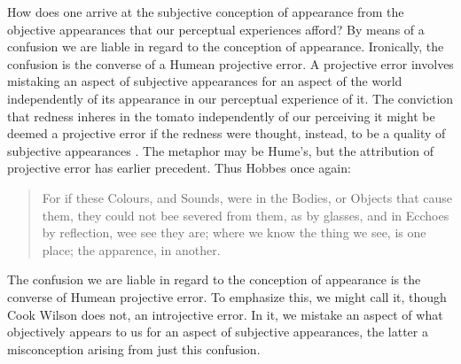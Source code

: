 \documentclass[12pt]{article}
\begin{document}
How does one arrive at the subjective conception of appearance from the objective appearances that our perceptual experiences afford? By means of a confusion we are liable in regard to the conception of appearance. Ironically, the confusion is the converse of a Humean projective error. A projective error involves mistaking an aspect of subjective appearances for an aspect of the world independently of its appearance in our perceptual experience of it. The conviction that redness inheres in the tomato independently of our perceiving it might be deemed a projective error if the redness were thought, instead, to be a quality of subjective appearances \citep[for a contemporary version of this view see][]{Boghossian-Velleman:1989af,Boghossian-Velleman:1991as}. The metaphor may be Hume's, but the attribution of projective error has earlier precedent. Thus Hobbes once again:
\begin{quote}
    For if these Colours, and Sounds, were in the Bodies, or Objects that cause them, they could not bee severed from them, as by glasses, and in Ecchoes by reflection, wee see they are; where we know the thing we see, is one place; the apparence, in another. \citep[\emph{Leviathan},][\textsc{i}.1]{Hobbes:1651fk}
\end{quote}
The confusion we are liable in regard to the conception of appearance is the converse of Humean projective error. To emphasize this, we might call it, though Cook Wilson does not, an introjective error. In it, we mistake an aspect of what objectively appears to us for an aspect of subjective appearances, the latter a misconception arising from just this confusion.
\end{document}
